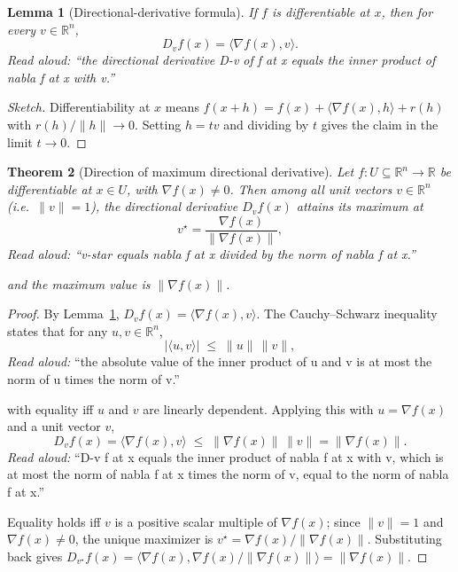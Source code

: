\documentclass[11pt]{article}
\newtheorem{theorem}{Theorem}
\newtheorem{lemma}[theorem]{Lemma}
\theoremstyle{definition}
\begin{document}
\begin{lemma}[Directional-derivative formula]
\label{lem:dirderiv}
If $f$ is differentiable at $x$, then for every $v \in \mathbb{R}^n$,
\[
D_v f(x) = \langle \nabla f(x), v\rangle.
\]
\emph{Read aloud:} ``the directional derivative D-v of f at x equals the inner product of nabla f at x with v.''
\end{lemma}
\begin{proof}[Sketch]
Differentiability at $x$ means $f(x + h) = f(x) + \langle \nabla f(x), h\rangle + r(h)$
with $r(h)/\|h\| \to 0$. Setting $h = tv$ and dividing by $t$ gives the claim
in the limit $t \to 0$.
\end{proof}

\begin{theorem}[Direction of maximum directional derivative]
\label{thm:steepest}
Let $f : U \subseteq \mathbb{R}^n \to \mathbb{R}$ be differentiable at
$x \in U$, with $\nabla f(x) \neq 0$. Then among all unit vectors
$v \in \mathbb{R}^n$ (i.e.\ $\|v\| = 1$), the directional derivative
$D_v f(x)$ attains its maximum at
\[
v^\star = \frac{\nabla f(x)}{\|\nabla f(x)\|},
\]
\emph{Read aloud:} ``v-star equals nabla f at x divided by the norm of nabla f at x.''

and the maximum value is $\|\nabla f(x)\|$.
\end{theorem}

\begin{proof}
By Lemma~\ref{lem:dirderiv}, $D_v f(x) = \langle \nabla f(x), v\rangle$.
The Cauchy--Schwarz inequality states that for any $u, v \in \mathbb{R}^n$,
\[
|\langle u, v\rangle| \;\le\; \|u\|\,\|v\|,
\]
\emph{Read aloud:} ``the absolute value of the inner product of u and v is at most the norm of u times the norm of v.''

with equality iff $u$ and $v$ are linearly dependent. Applying this with
$u = \nabla f(x)$ and a unit vector $v$,
\[
D_v f(x) = \langle \nabla f(x), v\rangle \;\le\; \|\nabla f(x)\|\,\|v\|
        = \|\nabla f(x)\|.
\]
\emph{Read aloud:} ``D-v f at x equals the inner product of nabla f at x with v, which is at most the norm of nabla f at x times the norm of v, equal to the norm of nabla f at x.''

Equality holds iff $v$ is a positive scalar multiple of $\nabla f(x)$;
since $\|v\| = 1$ and $\nabla f(x) \neq 0$, the unique maximizer is
$v^\star = \nabla f(x)/\|\nabla f(x)\|$. Substituting back gives
$D_{v^\star} f(x) = \langle \nabla f(x), \nabla f(x)/\|\nabla f(x)\|\rangle
= \|\nabla f(x)\|$. \qedhere
\end{proof}
\end{document}
